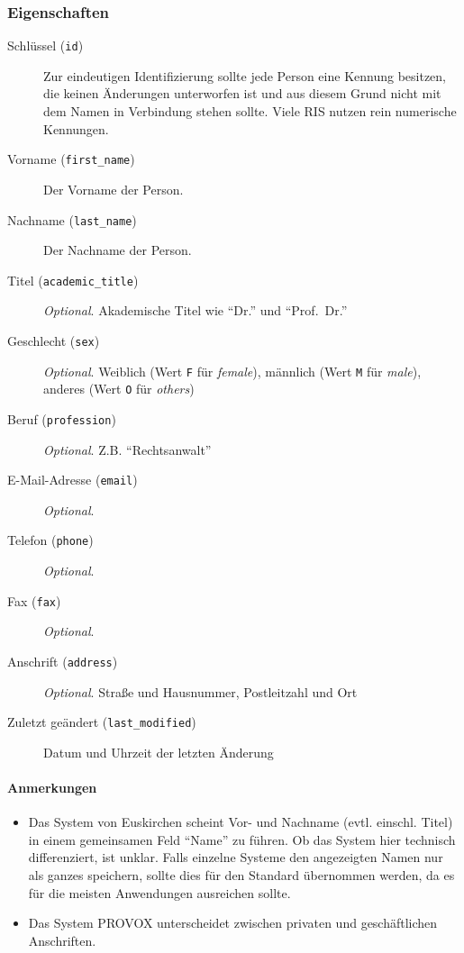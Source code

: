\documentclass[,a4paper]{article}
\begin{document}
\subsubsection{Eigenschaften}

\begin{description}
\item[Schlüssel (\texttt{id})]
Zur eindeutigen Identifizierung sollte jede Person eine Kennung
besitzen, die keinen Änderungen unterworfen ist und aus diesem Grund
nicht mit dem Namen in Verbindung stehen sollte. Viele RIS nutzen rein
numerische Kennungen.
\item[Vorname (\texttt{first\_name})]
Der Vorname der Person.
\item[Nachname (\texttt{last\_name})]
Der Nachname der Person.
\item[Titel (\texttt{academic\_title})]
\emph{Optional}. Akademische Titel wie ``Dr.'' und ``Prof.~Dr.''
\item[Geschlecht (\texttt{sex})]
\emph{Optional}. Weiblich (Wert \texttt{F} für \emph{female}), männlich
(Wert \texttt{M} für \emph{male}), anderes (Wert \texttt{O} für
\emph{others})
\item[Beruf (\texttt{profession})]
\emph{Optional}. Z.B. ``Rechtsanwalt''
\item[E-Mail-Adresse (\texttt{email})]
\emph{Optional}.
\item[Telefon (\texttt{phone})]
\emph{Optional}.
\item[Fax (\texttt{fax})]
\emph{Optional}.
\item[Anschrift (\texttt{address})]
\emph{Optional}. Straße und Hausnummer, Postleitzahl und Ort
\item[Zuletzt geändert (\texttt{last\_modified})]
Datum und Uhrzeit der letzten Änderung
\end{description}

\paragraph{Anmerkungen}

\begin{itemize}
\item
  Das System von Euskirchen scheint Vor- und Nachname (evtl. einschl.
  Titel) in einem gemeinsamen Feld ``Name'' zu führen. Ob das System
  hier technisch differenziert, ist unklar. Falls einzelne Systeme den
  angezeigten Namen nur als ganzes speichern, sollte dies für den
  Standard übernommen werden, da es für die meisten Anwendungen
  ausreichen sollte.
\item
  Das System PROVOX unterscheidet zwischen privaten und geschäftlichen
  Anschriften.
\end{itemize}
\end{document}
